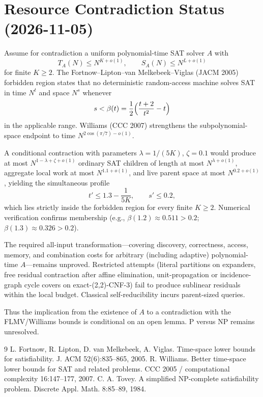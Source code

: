 
\section*{Resource Contradiction Status (2026-11-05)}

Assume for contradiction a uniform polynomial-time SAT solver \(A\) with
\[
T_A(N) \le N^{K+o(1)}, \qquad S_A(N) \le N^{L+o(1)}
\]
for finite \(K \ge 2\). The Fortnow–Lipton–van Melkebeek–Viglas (JACM 2005) forbidden region states that no deterministic random-access machine solves SAT in time \(N^t\) and space \(N^s\) whenever
\[
s < \beta(t) = \frac12 \Bigl( \frac{t+2}{t^2} - t \Bigr)
\]
in the applicable range. Williams (CCC 2007) strengthens the subpolynomial-space endpoint to time \(N^{2\cos(\pi/7)-o(1)}\).

A conditional contraction with parameters \(\lambda = 1/(5K)\), \(\zeta = 0.1\) would produce at most \(N^{1-\lambda+\zeta+o(1)}\) ordinary SAT children of length at most \(N^{\lambda+o(1)}\), aggregate local work at most \(N^{1.1+o(1)}\), and live parent space at most \(N^{0.2+o(1)}\), yielding the simultaneous profile
\[
t' \le 1.3 - \frac1{5K}, \qquad s' \le 0.2,
\]
which lies strictly inside the forbidden region for every finite \(K \ge 2\). Numerical verification confirms membership (e.g., \(\beta(1.2) \approx 0.511 > 0.2\); \(\beta(1.3) \approx 0.326 > 0.2\)).

The required all-input transformation—covering discovery, correctness, access, memory, and combination costs for arbitrary (including adaptive) polynomial-time \(A\)—remains unproved. Restricted attempts (literal partitions on expanders, free residual contraction after affine elimination, unit-propagation or incidence-graph cycle covers on exact-(2,2)-CNF-3) fail to produce sublinear residuals within the local budget. Classical self-reducibility incurs parent-sized queries.

Thus the implication from the existence of \(A\) to a contradiction with the FLMV/Williams bounds is conditional on an open lemma. P versus NP remains unresolved.

\begin{thebibliography}{9}
 L. Fortnow, R. Lipton, D. van Melkebeek, A. Viglas. Time-space lower bounds for satisfiability. J. ACM 52(6):835–865, 2005.
 R. Williams. Better time-space lower bounds for SAT and related problems. CCC 2005 / computational complexity 16:147–177, 2007.
 C. A. Tovey. A simplified NP-complete satisfiability problem. Discrete Appl. Math. 8:85–89, 1984.
\end{thebibliography}
